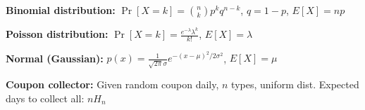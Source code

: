 \vspace{2.5mm}
\textbf{Binomial distribution:} $\Pr[X = k] = \binom{n}{k} p^k q^{n-k}$, $q = 1-p$, $E[X] = np$

\vspace{2.5mm}
\textbf{Poisson distribution:} $\Pr[X = k] = \frac{e^{-\lambda} \lambda^k}{k!}$, $E[X] = \lambda$

\vspace{2.5mm}
\textbf{Normal (Gaussian):} $p(x) = \frac{1}{\sqrt{2\pi}\sigma} e^{-(x-\mu)^2/2\sigma^2}$, $E[X] = \mu$

\vspace{2.5mm}
\textbf{Coupon collector:} Given random coupon daily, $n$ types, uniform dist. Expected days to collect all: $nH_n$
